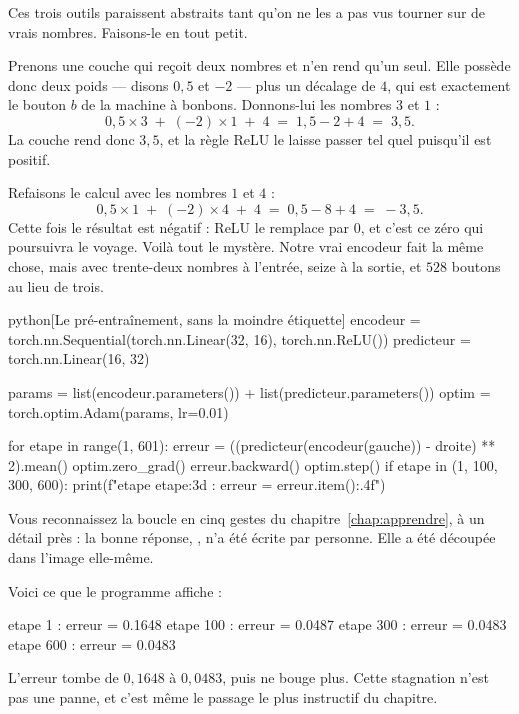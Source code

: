 Ces trois outils paraissent abstraits tant qu'on ne les a pas vus tourner sur
de vrais nombres. Faisons-le en tout petit.

\begin{exemple}
Prenons une couche qui reçoit deux nombres et n'en rend qu'un seul. Elle
possède donc deux poids — disons $0{,}5$ et $-2$ — plus un décalage de $4$,
qui est exactement le bouton $b$ de la machine à bonbons. Donnons-lui les
nombres $3$ et $1$ :
\[
  0{,}5 \times 3 \;+\; (-2) \times 1 \;+\; 4
  \;=\; 1{,}5 - 2 + 4 \;=\; 3{,}5 .
\]
La couche rend donc $3{,}5$, et la règle ReLU le laisse passer tel quel
puisqu'il est positif.

Refaisons le calcul avec les nombres $1$ et $4$ :
\[
  0{,}5 \times 1 \;+\; (-2) \times 4 \;+\; 4
  \;=\; 0{,}5 - 8 + 4 \;=\; -3{,}5 .
\]
Cette fois le résultat est négatif : ReLU le remplace par $0$, et c'est ce
zéro qui poursuivra le voyage. Voilà tout le mystère. Notre vrai encodeur
fait la même chose, mais avec trente-deux nombres à l'entrée, seize à la
sortie, et $528$ boutons au lieu de trois.
\end{exemple}

\begin{code}{python}[Le pré-entraînement, sans la moindre étiquette]
encodeur = torch.nn.Sequential(torch.nn.Linear(32, 16), torch.nn.ReLU())
predicteur = torch.nn.Linear(16, 32)

params = list(encodeur.parameters()) + list(predicteur.parameters())
optim = torch.optim.Adam(params, lr=0.01)

for etape in range(1, 601):
    erreur = ((predicteur(encodeur(gauche)) - droite) ** 2).mean()
    optim.zero_grad()
    erreur.backward()
    optim.step()
    if etape in (1, 100, 300, 600):
        print(f"etape {etape:3d} : erreur = {erreur.item():.4f}")
\end{code}

Vous reconnaissez la boucle en cinq gestes du chapitre~\ref{chap:apprendre},
à un détail près : la bonne réponse, , n'a été écrite par
personne. Elle a été découpée dans l'image elle-même.

Voici ce que le programme affiche :

\begin{sortie}
etape   1 : erreur = 0.1648
etape 100 : erreur = 0.0487
etape 300 : erreur = 0.0483
etape 600 : erreur = 0.0483
\end{sortie}

L'erreur tombe de $0{,}1648$ à $0{,}0483$, puis ne bouge plus. Cette
stagnation n'est pas une panne, et c'est même le passage le plus instructif
du chapitre.

